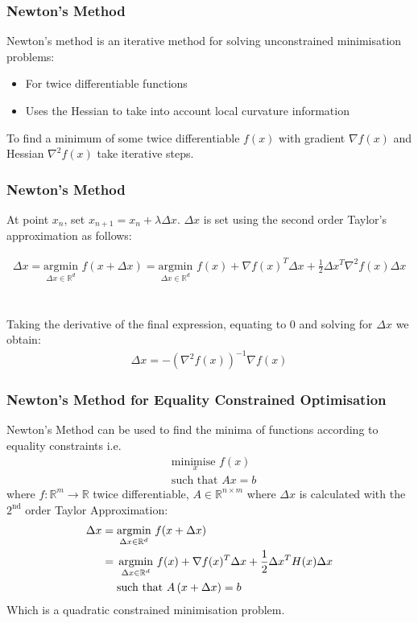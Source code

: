 \documentclass{beamer}
\def\rnum{\mathbb{R}}
\begin{document}
\begin{frame}
    \frametitle{Newton's Method}
    Newton's method is an iterative method for solving unconstrained minimisation problems:
    \begin{itemize}
        \item For twice differentiable functions
        \item Uses the Hessian to take into account local curvature information
    \end{itemize}
    To find a minimum of some twice differentiable $f(x)$ with gradient $\nabla
    f(x)$ and Hessian $\nabla^{2}f(x)$ take iterative
    steps.
\end{frame}

\begin{frame}
    \frametitle{Newton's Method}
    At point $x_{n}$, set $x_{n+1} = x_{n} + \lambda \Delta x$. $\Delta x$ is set
    using the second order Taylor's approximation as follows:

    \begin{align*}
        \Delta x = \underset{\Delta x \in \rnum^{d}}{\text{argmin}}\, \,f(x + \Delta
        x) = \underset{\Delta x \in \rnum^{d}}{\text{argmin}} \, \, f(x) + \nabla f(x)^{T}
        \Delta x + \frac{1}{2}\Delta x^{T}\nabla^{2}f(x)\Delta x
    \end{align*}
    \\~\\
    Taking the derivative of the final expression, equating to 0 and solving for
    $\Delta x$ we obtain:
    \begin{align*}
        \Delta x = -(\nabla^{2}f(x))^{-1}\nabla f(x)
    \end{align*}
\end{frame}


\begin{frame}
    \frametitle{Newton's Method for Equality Constrained Optimisation}
    Newton's Method can be used to find the minima of functions according to
    equality constraints i.e.
    \begin{align*}
        &\underset{x}{\text{minimise }}  f(x) \\
        &\text{such that } A x = b
    \end{align*}
    where $f : \rnum^{m} \rightarrow \rnum$ twice differentiable, $A \in \rnum^{n \times m} $
    where $\Delta x$ is calculated with the $2^{\text{nd}}$ order Taylor Approximation:
    {\footnotesize
    \begin{align*}
        \Delta x &= \underset{\Delta x \in \rnum^{d}}{\text{argmin}}\, \,f(x + \Delta
        x)  \\
        &= \, \underset{\Delta x \in \rnum^{d}}{\text{argmin}} \, \, f(x) + \nabla f(x)^{T}
        \Delta x + \frac{1}{2}\Delta x^{T}H(x)\Delta x \\ \vspace{1mm}
        &\,\,\,\,\,\, \text{             such that } A\, (x + \Delta x) = b
    \end{align*}}
    Which is a quadratic constrained minimisation problem.
\end{frame}
\end{document}
